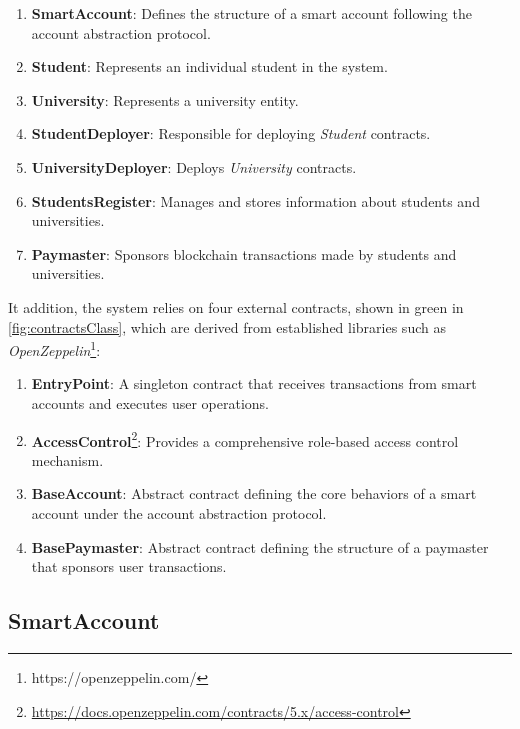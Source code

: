 \begin{enumerate}
    \item \textbf{SmartAccount}: Defines the structure of a smart account following the account abstraction protocol.
    \item \textbf{Student}: Represents an individual student in the system.
    \item \textbf{University}: Represents a university entity.
    \item \textbf{StudentDeployer}: Responsible for deploying \textit{Student} contracts.
    \item \textbf{UniversityDeployer}: Deploys \textit{University} contracts.
    \item \textbf{StudentsRegister}: Manages and stores information about students and universities.
    \item \textbf{Paymaster}: Sponsors blockchain transactions made by students and universities.
\end{enumerate}
It addition, the system relies on four external contracts, shown in green in \cref{fig:contractsClass}, which are derived from established libraries such as \textit{OpenZeppelin}\footnote{https://openzeppelin.com/}:
\begin{enumerate}
    \item \textbf{EntryPoint}: A singleton contract that receives transactions from smart accounts and executes user operations.
    \item \textbf{AccessControl}\footnote{\url{https://docs.openzeppelin.com/contracts/5.x/access-control}}: Provides a comprehensive role-based access control mechanism.
    \item \textbf{BaseAccount}: Abstract contract defining the core behaviors of a smart account under the account abstraction protocol.
    \item \textbf{BasePaymaster}: Abstract contract defining the structure of a paymaster that sponsors user transactions.
\end{enumerate}

\subsection{SmartAccount}

